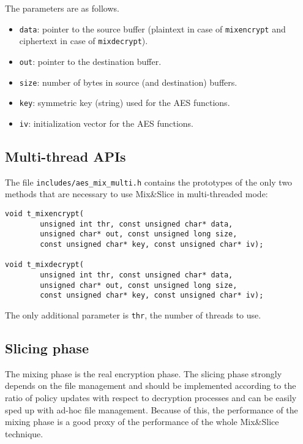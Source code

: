 The parameters are as follows.

\begin{itemize}
\tightlist
\item
  \texttt{data}: pointer to the source buffer (plaintext in case of
  \texttt{mixencrypt} and ciphertext in case of \texttt{mixdecrypt}).
\item
  \texttt{out}: pointer to the destination buffer.
\item
  \texttt{size}: number of bytes in source (and destination) buffers.
\item
  \texttt{key}: symmetric key (string) used for the AES functions.
\item
  \texttt{iv}: initialization vector for the AES functions.
\end{itemize}

\subsection{Multi-thread APIs}\label{multi-thread-apis}

The file \texttt{includes/aes\_mix\_multi.h} contains the prototypes of
the only two methods that are necessary to use Mix\&Slice in
multi-threaded mode:

\begin{verbatim}
void t_mixencrypt(
        unsigned int thr, const unsigned char* data,
        unsigned char* out, const unsigned long size,
        const unsigned char* key, const unsigned char* iv);

void t_mixdecrypt(
        unsigned int thr, const unsigned char* data,
        unsigned char* out, const unsigned long size,
        const unsigned char* key, const unsigned char* iv);
\end{verbatim}

The only additional parameter is \texttt{thr}, the number of threads to
use.

\subsection{Slicing phase}\label{slicing-phase}

The mixing phase is the real encryption phase. The slicing phase
strongly depends on the file management and should be implemented
according to the ratio of policy updates with respect to decryption
processes and can be easily sped up with ad-hoc file management. Because
of this, the performance of the mixing phase is a good proxy of the
performance of the whole Mix\&Slice technique.

